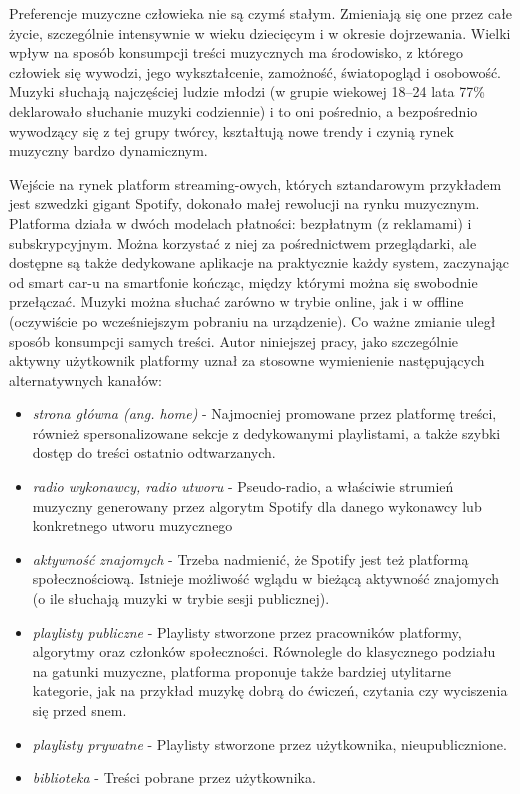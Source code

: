 \documentclass[a4paper,12pt]{article}
\numberwithin{figure}{section}
\begin{document}
    \bigskip

    Preferencje muzyczne człowieka nie są czymś stałym. Zmieniają się one przez całe życie, szczególnie intensywnie w wieku dziecięcym i w okresie dojrzewania\cite{PreferencjeMuzyczneWCzasachSteamingu2020}. Wielki wpływ na sposób konsumpcji treści muzycznych ma środowisko, z którego człowiek się wywodzi, jego wykształcenie, zamożność, światopogląd i osobowość\cite{PreferencjeMuzyczneWCzasachSteamingu2020}. Muzyki słuchają najczęściej ludzie młodzi (w grupie wiekowej 18--24 lata 77\% deklarowało słuchanie muzyki codziennie\cite{cbos2018}) i to oni pośrednio, a bezpośrednio wywodzący się z tej grupy twórcy, kształtują nowe trendy i czynią rynek muzyczny bardzo dynamicznym.

    \bigskip

    Wejście na rynek platform streaming-owych, których sztandarowym przykładem jest szwedzki gigant Spotify, dokonało małej rewolucji na rynku muzycznym. Platforma działa w dwóch modelach płatności: bezpłatnym (z reklamami) i subskrypcyjnym. Można korzystać z niej za pośrednictwem przeglądarki, ale dostępne są także dedykowane aplikacje na praktycznie każdy system, zaczynając od smart car-u na smartfonie kończąc, między którymi można się swobodnie przełączać. Muzyki można słuchać zarówno w trybie online, jak i w offline (oczywiście po wcześniejszym pobraniu na urządzenie). Co ważne zmianie uległ sposób konsumpcji samych treści. Autor niniejszej pracy, jako szczególnie aktywny użytkownik platformy uznał za stosowne wymienienie następujących alternatywnych kanałów:
    \begin{itemize}
        \item \textit{strona główna (ang. home)} - Najmocniej promowane przez platformę treści, również spersonalizowane sekcje z dedykowanymi playlistami, a także szybki dostęp do treści ostatnio odtwarzanych.
        \item \textit{radio wykonawcy, radio utworu} - Pseudo-radio, a właściwie strumień muzyczny generowany przez algorytm Spotify dla danego wykonawcy lub konkretnego utworu muzycznego
        \item \textit{aktywność znajomych} - Trzeba nadmienić, że Spotify jest też platformą społecznościową. Istnieje możliwość wglądu w bieżącą aktywność znajomych (o ile słuchają muzyki w trybie sesji publicznej).
        \item \textit{playlisty publiczne} - Playlisty stworzone przez pracowników platformy, algorytmy oraz członków społeczności. Równolegle do klasycznego podziału na gatunki muzyczne, platforma proponuje także bardziej utylitarne kategorie, jak na przykład muzykę dobrą do ćwiczeń, czytania czy wyciszenia się przed snem.
        \item \textit{playlisty prywatne} - Playlisty stworzone przez użytkownika, nieupublicznione.
        \item \textit{biblioteka} - Treści pobrane przez użytkownika.
    \end{itemize}
\end{document}
